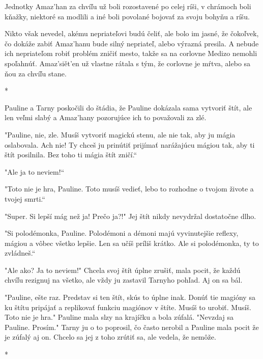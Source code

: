 \documentclass{book}
\begin{document}
Jednotky Amaz'han za chvíľu už boli rozostavené po celej ríši, v chrámoch boli kňažky, niektoré sa modlili a iné boli povolané bojovať za svoju bohyňu a ríšu.

Nikto však nevedel, akému nepriateľovi budú čeliť, ale bolo im jasné, že čokoľvek, čo dokáže zabiť Amaz'hanu bude silný nepriateľ, alebo výrazná presila. A nebude ich nepriateľom robiť problém zničiť mesto, takže sa na corlovne Medizo nemohli spoľahnúť. Amaz'sie\v{}t'en už vlastne rátala s tým, že corlovne je mŕtva, alebo sa ňou za chvíľu stane.

\begin{center}
*
\end{center}

Pauline a Tarny poskočili do štádia, že Pauline dokázala sama vytvoriť štít, ale len veľmi slabý a Amaz'hany pozorujúce ich to považovali za zlé.

"$ $Pauline, nie, zle. Musíš vytvoriť magickú stenu, ale nie tak, aby ju mágia oslabovala. Ach nie! Ty chceš ju prinútiť prijímať narážajúcu mágiou tak, aby ti štít posilnila. Bez toho ti mágia štít zničí.“

"$ $Ale ja to neviem!“

"$ $Toto nie je hra, Pauline. Toto musíš vedieť, lebo to rozhodne o tvojom živote a tvojej smrti.“

"$ $Super. Si lepší mág než ja! Prečo ja?!"$ $ Jej štít nikdy nevydržal dostatočne dlho.

"$ $Si polodémonka, Pauline. Polodémoni a démoni majú vyvinutejšie reflexy, mágiou a vôbec všetko lepšie. Len sa učíš príliš krátko. Ale si polodémonka, ty to zvládneš.“

"$ $Ale ako? Ja to neviem!"$ $ Chcela svoj štít úplne zrušiť, mala pocit, že každú chvíľu rezignuj na všetko, ale vždy ju zastavil Tarnyho pohľad. Aj on sa bál.

"$ $Pauline, ešte raz. Predstav si ten štít, skús to úplne inak. Donúť tie magióny sa ku štítu pripájať a replikovať funkciu magiónov v štíte. Musíš to urobiť. Musíš. Toto nie je hra."$ $ Pauline mala slzy na krajíčku a bola zúfalá. "$ $Nevzdaj sa Pauline. Prosím."$ $ Tarny ju o to poprosil, čo často nerobil a Pauline mala pocit že je zúfalý aj on. Chcelo sa jej z toho zrútiť sa, ale vedela, že nemôže.

\begin{center}
*
\end{center}
\end{document}
